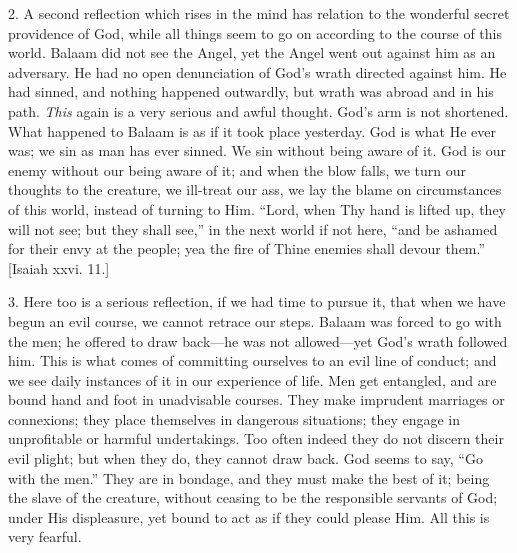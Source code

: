2. A second reflection which rises in the mind has relation to the
wonderful secret providence of God, while all things seem to go on
according to the course of this world. Balaam did not see the Angel,
yet the Angel went out against him as an adversary. He had no open
denunciation of God's wrath directed against him. He had sinned, and
nothing happened outwardly, but wrath was abroad and in his path. \emph{This}
again is a very serious and awful thought. God's arm is not shortened.
What happened to Balaam is as if it took place yesterday. God is what
He ever was; we sin as man has ever sinned. We sin without being aware
of it. God is our enemy without our being aware of it; and when the
blow falls, we turn our thoughts to the creature, we ill-treat our
ass, we lay the blame on circumstances of this world, instead of
turning to Him. ``Lord, when Thy hand is lifted up, they will not
see; but they shall see,'' in the next world if not here,
``and be ashamed for their envy at the people; yea the fire of
Thine enemies shall devour them.'' [Isaiah xxvi. 11.]

3. Here too is a serious reflection, if we had time to pursue it,
that when we have begun an evil course, we cannot retrace our steps.
Balaam was forced to go with the men; he offered to draw back—he was
not allowed—yet God's wrath followed him. This is what comes of
committing ourselves to an evil line of conduct; and we see daily
instances of it in our experience of life. Men get entangled, and are
bound hand and foot in unadvisable courses. They make imprudent
marriages or connexions; they place themselves in dangerous
situations; they engage in unprofitable or harmful undertakings. Too
often indeed they do not discern their evil plight; but when they do,
they cannot draw back. God seems to say, ``Go with the men.''
They are in bondage, and they must make the best of it; being the
slave of the creature, without ceasing to be the responsible servants
of God; under His displeasure, yet bound to act as if they could
please Him. All this is very fearful.


